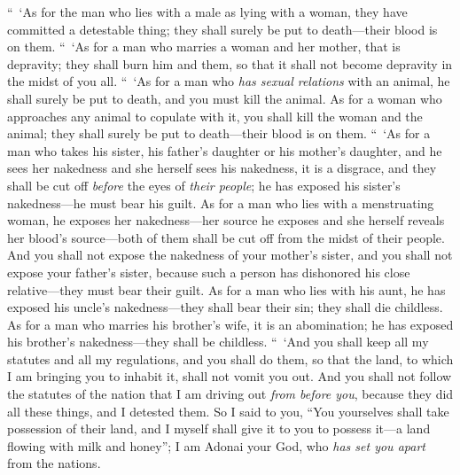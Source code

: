 \begin{biblechapter}
\verse “ ‘As for the man who lies with a male as lying with a woman, they have committed a detestable thing; they shall surely be put to death—their blood is on them.
\verse “ ‘As for a man who marries a woman and her mother, that is depravity; they shall burn him and them, so that it shall not become depravity in the midst of you all.
\verse “ ‘As for a man who \textit{has sexual relations} with an animal, he shall surely be put to death, and you must kill the animal.
\verse As for a woman who approaches any animal to copulate with it, you shall kill the woman and the animal; they shall surely be put to death—their blood is on them.
\verse “ ‘As for a man who takes his sister, his father’s daughter or his mother’s daughter, and he sees her nakedness and she herself sees his nakedness, it is a disgrace, and they shall be cut off \textit{before} the eyes of \textit{their people}; he has exposed his sister’s nakedness—he must bear his guilt.
\verse As for a man who lies with a menstruating woman, he exposes her nakedness—her source he exposes and she herself reveals her blood’s source—both of them shall be cut off from the midst of their people.
\verse And you shall not expose the nakedness of your mother’s sister, and you shall not expose your father’s sister, because such a person has dishonored his close relative—they must bear their guilt.
\verse As for a man who lies with his aunt, he has exposed his uncle’s nakedness—they shall bear their sin; they shall die childless.
\verse As for a man who marries his brother’s wife, it is an abomination; he has exposed his brother’s nakedness—they shall be childless.
 “ ‘And you shall keep all my statutes and all my regulations, and you shall do them, so that the land, to which I am bringing you to inhabit it, shall not vomit you out.
\verse And you shall not follow the statutes of the nation that I am driving out \textit{from before you}, because they did all these things, and I detested them.
\verse So I said to you, “You yourselves shall take possession of their land, and I myself shall give it to you to possess it—a land flowing with milk and honey”; I am Adonai your God, who \textit{has set you apart} from the nations.

\end{biblechapter}
